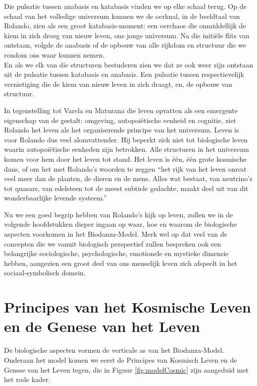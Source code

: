 \documentclass[
  11pt,
]{book}
\begin{document}
Die pulsatie tussen anabasis en katabasis vinden we op elke schaal terug.
Op de schaal van het volledige universum kunnen we de oerknal, in de beeldtaal van Rolando, zien als een groot katabasis-moment: een oerchaos die onmiddellijk de kiem in zich droeg van nieuw leven, ons jonge universum. Na die initiële flits van ontstaan, volgde de anabasis of de opbouw van alle rijkdom en structuur die we rondom ons waar kunnen nemen.\\
En als we elk van die structuren bestuderen zien we dat ze ook weer zijn ontstaan uit de pulsatie tussen katabasis en anabasis.
Een pulsatie tussen respectievelijk vernietiging die de kiem van nieuw leven in zich draagt, en, de opbouw van structuur.

In tegenstelling tot Varela en Maturana die leven opvatten als een emergente eigenschap van de gestalt: omgeving, autopoiëtische eenheid en cognitie, ziet Rolando het leven als het organiserende principe van het universum. Leven is voor Rolando dus veel alomvattender. Hij beperkt zich niet tot biologische leven waarin autopoiëtische eenheden zijn betrokken. Alle structuren in het universum komen voor hem door het leven tot stand. Het leven is één, één grote kosmische dans, of om het met Rolando's woorden te zeggen ``het rijk van het leven omvat veel meer dan de planten, de dieren en de mens. Alles wat bestaat, van neutrino's tot quasars, van edelsteen tot de meest subtiele gedachte, maakt deel uit van dit wonderbaarlijke levende systeem.''

Nu we een goed begrip hebben van Rolando's kijk op leven, zullen we in de volgende hoofdstukken dieper ingaan op waar, hoe en waarom de biologische aspecten voorkomen in het Biodanza-Model. Merk wel op dat veel van de concepten die we vanuit biologisch perspectief zullen bespreken ook een belangrijke sociologische, psychologische, emotionele en mystieke dimensie hebben, aangezien een groot deel van ons menselijk leven zich afspeelt in het sociaal-symbolisch domein.

\chapter{Principes van het Kosmische Leven en de Genese van het Leven}\label{principes-van-het-kosmische-leven-en-de-genese-van-het-leven}

De biologische aspecten vormen de verticale as van het Biodanza-Model. Onderaan het model komen we eerst de Principes van Kosmisch Leven en de Genese van het Leven tegen, die in Figuur \ref{fig:modelCosmic} zijn aangeduid met het rode kader.
\end{document}
